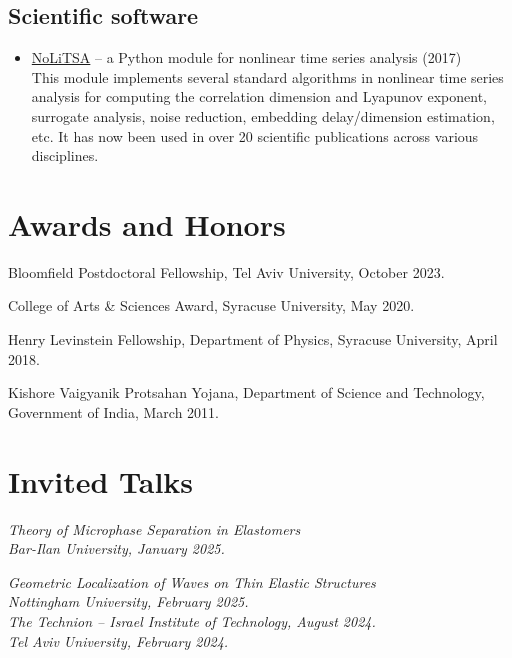 \documentclass[10pt,article,oneside]{memoir}
\def\textsl#1{\bgroup\fontfamily{ppl}\selectfont\slshape{#1}\egroup}
\begin{document}
\subsection{Scientific software}

\begin{itemize}
\item \href{https://github.com/manu-mannattil/nolitsa}{NoLiTSA} -- a Python module for nonlinear time series analysis (2017)\\
  This module implements several standard algorithms in nonlinear time series analysis for computing the correlation dimension and Lyapunov exponent, surrogate analysis, noise reduction, embedding delay/dimension estimation, etc.
  It has now been used in over 20 scientific publications across various disciplines.
\end{itemize}


\section{Awards and Honors}

Bloomfield Postdoctoral Fellowship, Tel Aviv University, October 2023.

College of Arts \& Sciences Award, Syracuse University, May 2020.

Henry Levinstein Fellowship, Department of Physics, Syracuse University, April 2018.

Kishore Vaigyanik Protsahan Yojana, Department of Science and Technology, Government of India, March 2011.


\section{Invited Talks}

\textsl{Theory of Microphase Separation in Elastomers}\\
  Bar-Ilan University, January 2025.

\textsl{Geometric Localization of Waves on Thin Elastic Structures}\\
  Nottingham University, February 2025.\\
  The Technion -- Israel Institute of Technology, August 2024.\\
  Tel Aviv University, February 2024.
\end{document}

